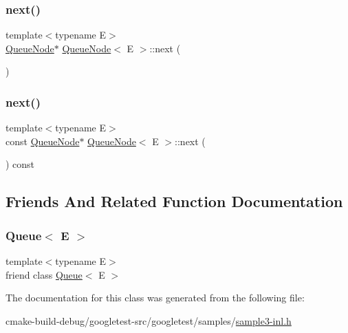 \mbox{\label{classQueueNode_a8a9fdf488da06533360999ef85db56ea}} 
\subsubsection{\texorpdfstring{next()}{next()}\hspace{0.1cm}{\footnotesize\ttfamily [1/2]}}
{\footnotesize\ttfamily template$<$typename E$>$ \\
\mbox{\hyperlink{classQueueNode}{Queue\+Node}}$\ast$ \mbox{\hyperlink{classQueueNode}{Queue\+Node}}$<$ E $>$\+::next (\begin{DoxyParamCaption}{ }\end{DoxyParamCaption})\hspace{0.3cm}{\ttfamily [inline]}}

\mbox{\label{classQueueNode_ada477e4f309f29383112dbda473dd985}} 
\subsubsection{\texorpdfstring{next()}{next()}\hspace{0.1cm}{\footnotesize\ttfamily [2/2]}}
{\footnotesize\ttfamily template$<$typename E$>$ \\
const \mbox{\hyperlink{classQueueNode}{Queue\+Node}}$\ast$ \mbox{\hyperlink{classQueueNode}{Queue\+Node}}$<$ E $>$\+::next (\begin{DoxyParamCaption}{ }\end{DoxyParamCaption}) const\hspace{0.3cm}{\ttfamily [inline]}}



\subsection{Friends And Related Function Documentation}
\mbox{\label{classQueueNode_ad4336229b1d7c3626e4ba69f236b202d}} 
\subsubsection{\texorpdfstring{Queue$<$ E $>$}{Queue< E >}}
{\footnotesize\ttfamily template$<$typename E$>$ \\
friend class \mbox{\hyperlink{classQueue}{Queue}}$<$ E $>$\hspace{0.3cm}{\ttfamily [friend]}}



The documentation for this class was generated from the following file\+:\begin{DoxyCompactItemize}
\item 
cmake-\/build-\/debug/googletest-\/src/googletest/samples/\mbox{\hyperlink{sample3-inl_8h}{sample3-\/inl.\+h}}\end{DoxyCompactItemize}
